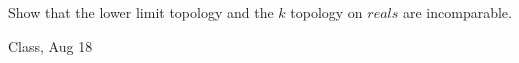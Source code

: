\begin{samepage}
\begin{ex}
Show that the lower limit topology and the $k$ topology on $reals$ are incomparable.
\end{ex}
\begin{source}
Class, Aug 18
\end{source}
\end{samepage}
